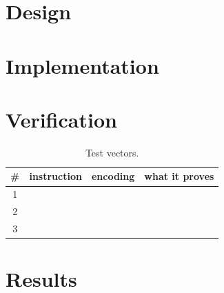 \section{Design}

\section{Implementation}


\section{Verification}
%

\begin{table}[htbp]
\centering
\caption{Test vectors.}
\label{tab:lab10-vectors}
\begin{tabular}{cllp{5.4cm}}
\toprule
\# & instruction & encoding & what it proves \\
\midrule
1 & & & \\
2 & & & \\
3 & & & \\
\bottomrule
\end{tabular}
\end{table}

\section{Results}

